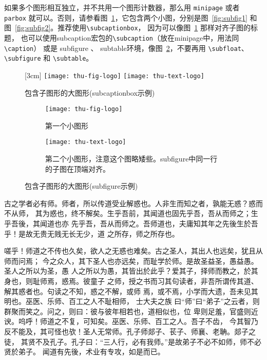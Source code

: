 如果多个图形相互独立，并不共用一个图形计数器，那么用 \verb|minipage| 或者
\verb|parbox| 就可以。否则，请参看图~\ref{fig:big1-subcaptionbox}，它包含两个小图，分别是图~\ref{fig:subfig1} 
和图~\ref{fig:subfig2}。推荐使用\verb|\subcaptionbox|，
因为可以像图~\ref{fig:big1-subcaptionbox} 那样对齐子图的标题，
也可以使用\textsf{subcaption}宏包的\verb|\subcaption|（放在minipage中，用法同\verb|\caption|）
或是 subfigure 、 subtable环境，像图~\ref{fig:big1-subfigure}，不要再用 \verb|\subfloat|、
\verb|\subfigure| 和 \verb|\subtable|。
\begin{figure}[h]
  \centering%
  [3cm] %
    {\texttt{[image: thu-fig-logo]}}
      \hspace{4em}%
      {\texttt{[image: thu-text-logo]}}
  \caption{包含子图形的大图形(subcaptionbox示例)}
  \label{fig:big1-subcaptionbox}
\end{figure}
\begin{figure}[h]
  \centering%
  \begin{subfigure}{3cm}
    \texttt{[image: thu-fig-logo]}
    \caption{第一个小图形}
  \end{subfigure}
  \hspace{4em}%
  \begin{subfigure}{0.5\textwidth}
    \texttt{[image: thu-text-logo]}
    \caption{第二个小图形，注意这个图略矮些。subfigure中同一行的子图在顶端对齐。}
  \end{subfigure}
  \caption{包含子图形的大图形(subfigure示例)}
  \label{fig:big1-subfigure}
\end{figure}
古之学者必有师。师者，所以传道受业解惑也。人非生而知之者，孰能无惑？惑而不从师，
其为惑也，终不解矣。生乎吾前，其闻道也固先乎吾，吾从而师之；生乎吾後，其闻道也亦
先乎吾，吾从而师之。吾师道也，夫庸知其年之先後生於吾乎！是故无贵无贱无长无少，道
之所存，师之所存也。

嗟乎！师道之不传也久矣，欲人之无惑也难矣。古之圣人，其出人也远矣，犹且从师而问焉；
今之众人，其下圣人也亦远矣，而耻学於师。是故圣益圣，愚益愚。圣人之所以为圣，愚
人之所以为愚，其皆出於此乎？爱其子，择师而教之，於其身也，则耻师焉，惑焉。彼童子
之师，授之书而习其句读者，非吾所谓传其道、解其惑者也。句读之不知，惑之不解，或师
焉，或不焉，小学而大遗，吾未见其明也。巫医、乐师、百工之人不耻相师，  士大夫之族
曰“师”曰“弟子”之云者，则群聚而笑之。问之，则曰：彼与彼年相若也，道相似也，位
卑则足羞，官盛则近谀。呜呼！师道之不复，可知矣。巫医、乐师、百工之人。吾子不齿，
今其智乃反不能及，其可怪也欤！圣人无常师。孔子师郯子、苌子、师襄、老聃。郯子之徒，
其贤不及孔子。孔子曰：“三人行，必有我师。”是故弟子不必不如师，师不必贤於弟子。
闻道有先後，术业有专攻，如是而已。

